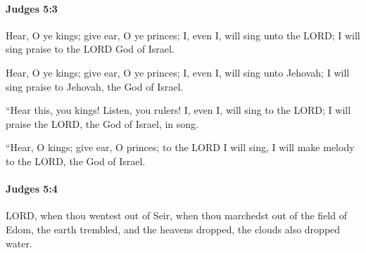 		\paragraph{Judges 5:3} %
			\label{JUDGES-5-3}

			Hear, O ye kings; give ear, O ye princes; I, even I, will sing unto the LORD; I will sing praise to the LORD God of Israel.

			\begin{versebox}
					\item[BHS] 
					\item[ASV] Hear, O ye kings; give ear, O ye princes; I, even I, will sing unto Jehovah; I will sing praise to Jehovah, the God of Israel.
					\item[NIV] “Hear this, you kings! Listen, you rulers! I, even I, will sing to the LORD; I will praise the LORD, the God of Israel, in song.
					\item[NRSV] “Hear, O kings; give ear, O princes; to the LORD I will sing, I will make melody to the LORD, the God of Israel.
			\end{versebox}

		\paragraph{Judges 5:4} %
			\label{JUDGES-5-4}

			LORD, when thou wentest out of Seir, when thou marchedst out of the field of Edom, the earth trembled, and the heavens dropped, the clouds also dropped water.

